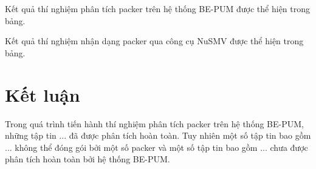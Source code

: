 \hspace{0.5cm}Kết quả thí nghiệm phân tích packer trên hệ thống BE-PUM được thể hiện trong bảng.

\hspace{0.5cm}Kết quả thí nghiệm nhận dạng packer qua công cụ NuSMV được thể hiện trong bảng.

\section{Kết luận}

\hspace{0.5cm}Trong quá trình tiến hành thí nghiệm phân tích packer trên hệ thống BE-PUM, những tập tin ... đã được phân tích hoàn toàn. Tuy nhiên một số tập tin bao gồm ... không thể đóng gói bởi một số packer và một số tập tin bao gồm ... chưa được phân tích hoàn toàn bởi hệ thống BE-PUM. 

